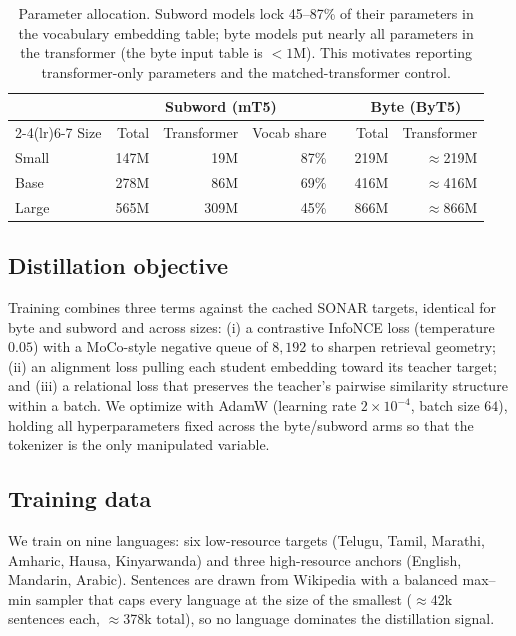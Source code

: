 \documentclass[11pt]{article}
\begin{document}
\begin{table}[t]
\centering
\small
\begin{tabular}{l rrr r rr}
\toprule
& \multicolumn{3}{c}{\textbf{Subword (mT5)}} & & \multicolumn{2}{c}{\textbf{Byte (ByT5)}}\\
\cmidrule(lr){2-4}\cmidrule(lr){6-7}
Size & Total & Transformer & Vocab share & & Total & Transformer\\
\midrule
Small & 147M & 19M  & 87\% & & 219M & $\approx$219M\\
Base  & 278M & 86M  & 69\% & & 416M & $\approx$416M\\
Large & 565M & 309M & 45\% & & 866M & $\approx$866M\\
\bottomrule
\end{tabular}
\caption{Parameter allocation. Subword models lock 45--87\% of their parameters in the vocabulary
embedding table; byte models put nearly all parameters in the transformer (the byte input table is
$<1$M). This motivates reporting transformer-only parameters and the matched-transformer control.}
\label{tab:params}
\end{table}

\subsection{Distillation objective}
Training combines three terms against the cached SONAR targets, identical for byte and subword and
across sizes: (i) a contrastive InfoNCE loss (temperature $0.05$) with a MoCo-style negative queue of
$8{,}192$ to sharpen retrieval geometry; (ii) an alignment loss pulling each student embedding toward
its teacher target; and (iii) a relational loss that preserves the teacher's pairwise similarity
structure within a batch. We optimize with AdamW (learning rate $2\times10^{-4}$, batch size $64$),
holding all hyperparameters fixed across the byte/subword arms so that the tokenizer is the only
manipulated variable.

\subsection{Training data}
We train on nine languages: six low-resource targets (Telugu, Tamil, Marathi, Amharic, Hausa,
Kinyarwanda) and three high-resource anchors (English, Mandarin, Arabic). Sentences are drawn from
Wikipedia with a balanced max--min sampler that caps every language at the size of the smallest
($\approx$42k sentences each, $\approx$378k total), so no language dominates the distillation signal.
\end{document}

